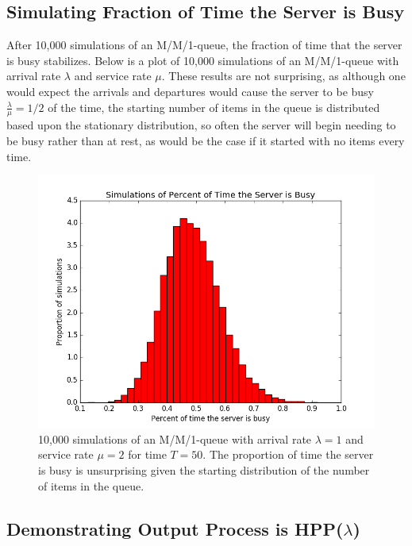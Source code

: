 \documentclass[11pt, oneside]{article}
\begin{document}
\subsection{Simulating Fraction of Time the Server is Busy}
After 10,000 simulations of an M/M/1-queue, the fraction of time that the server is busy stabilizes. Below is a plot of 10,000 simulations of an M/M/1-queue with arrival rate $\lambda$ and service rate $\mu$. These results are not surprising, as although one would expect the arrivals and departures would cause the server to be busy $\frac{\lambda}{\mu}=1/2$ of the time, the starting number of items in the queue is distributed based upon the stationary distribution, so often the server will begin needing to be busy rather than at rest, as would be the case if it started with no items every time.
\begin{figure}[H]
\includegraphics[scale=0.7]{busy_server}
\caption{10,000 simulations of an M/M/1-queue with arrival rate $\lambda=1$ and service rate $\mu=2$ for time $T=50$. The proportion of time the server is busy is unsurprising given the starting distribution of the number of items in the queue.}
\label{fig:x}
\end{figure}

\subsection{Demonstrating Output Process is HPP($\lambda$)}
\end{document}

